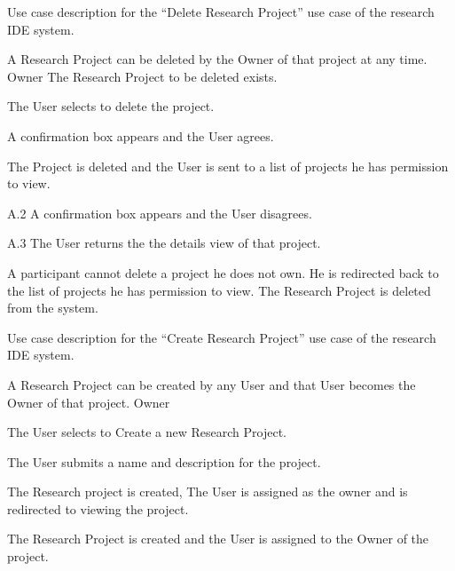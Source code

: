 \begin{table}
  \centering
  \caption{Use case description for the ``Delete Research Project'' use case of the research IDE system.}
  \label{tbl:use-case-delete-research-project}

  \begin{usecase}
    A Research Project can be deleted by the Owner of that project at any time.
    Owner
    The Research Project to be deleted exists.
    \ucnormal
    \begin{ucenum}
      \item The User selects to delete the project.
      \item A confirmation box appears and the User agrees.
      \item The Project is deleted and the User is sent to a list of projects he has permission to view.
    \end{ucenum}
    \begin{ucenum}
      \item [A.2] A confirmation box appears and the User disagrees.
      \item [A.3] The User returns the the details view of that project.
    \end{ucenum}
    A participant cannot delete a project he does not own. He is redirected back to the list of projects he has permission to view.
    The Research Project is deleted from the system.
  \end{usecase}
\end{table}


\begin{table}
  \centering
  \caption{Use case description for the ``Create Research Project'' use case of the research IDE system.}
  \label{tbl:use-case-create-research-project}

  \begin{usecase}
    A Research Project can be created by any User and that User becomes the Owner of that project.
    Owner
    \ucnormal
    \begin{ucenum}
      \item The User selects to Create a new Research Project.
      \item The User submits a name and description for the project.
      \item The Research project is created, The User is assigned as the owner and is redirected to viewing the project.
    \end{ucenum}
    The Research Project is created and the User is assigned to the Owner of the project.
  \end{usecase}
\end{table}


